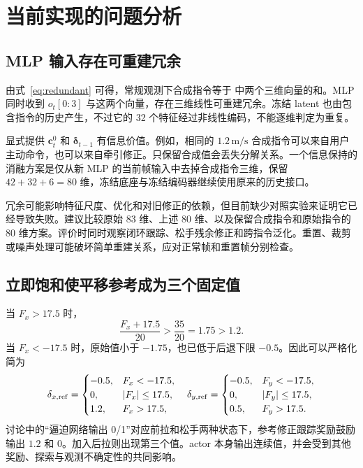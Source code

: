 \section{当前实现的问题分析}
\subsection{MLP 输入存在可重建冗余}
由式~\eqref{eq:redundant} 可得，常规观测下合成指令等于  中两个三维向量的和。MLP 同时收到 $o_t[0{:}3]$ 与这两个向量，存在三维线性可重建冗余。冻结 latent 也由包含指令的历史产生，不过它的 32 个特征经过非线性编码，不能逐维判定为重复。

显式提供 $\bm c^0_t$ 和 $\bm\delta_{t-1}$ 有信息价值。例如，相同的 $1.2\,\mathrm{m/s}$ 合成指令可以来自用户主动命令，也可以来自牵引修正。只保留合成值会丢失分解关系。一个信息保持的消融方案是仅从新 MLP 的当前帧输入中去掉合成指令三维，保留 $42+32+6=80$ 维，冻结底座与冻结编码器继续使用原来的历史接口。

冗余可能影响特征尺度、优化和对旧修正的依赖，但目前缺少对照实验来证明它已经导致失败。建议比较原始 83 维、上述 80 维、以及保留合成指令和原始指令的 80 维方案。评价时同时观察闭环跟踪、松手残余修正和跨指令泛化。重置、裁剪或噪声处理可能破坏简单重建关系，应对正常帧和重置帧分别检查。

\subsection{立即饱和使平移参考成为三个固定值}
当 $F_x>17.5$ 时，
\begin{equation}
 \frac{F_x+17.5}{20}>\frac{35}{20}=1.75>1.2.
\end{equation}
当 $F_x<-17.5$ 时，原始值小于 $-1.75$，也已低于后退下限 $-0.5$。因此可以严格化简为
\begin{equation}
 \delta_{x,\rm ref}=\begin{cases}
 -0.5,&F_x<-17.5,\\0,&|F_x|\le17.5,\\1.2,&F_x>17.5,
 \end{cases}\quad
 \delta_{y,\rm ref}=\begin{cases}
 -0.5,&F_y<-17.5,\\0,&|F_y|\le17.5,\\0.5,&F_y>17.5.
 \end{cases}
\label{eq:discrete}
\end{equation}
讨论中的“逼迫网络输出 0/1”对应前拉和松手两种状态下，参考修正跟踪奖励鼓励输出 $1.2$ 和 $0$。加入后拉则出现第三个值。actor 本身输出连续值，并会受到其他奖励、探索与观测不确定性的共同影响。

